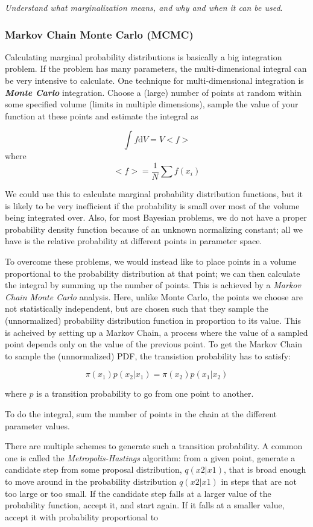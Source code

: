 \documentclass[12pt]{article}
\begin{document}
\emph{Understand what marginalization means, and why and when it can
be used}.


\subsubsection{Markov Chain Monte Carlo (MCMC)}
Calculating marginal probability distributions is basically a big
integration problem. If the problem has many parameters, the
multi-dimensional integral can be very intensive to calculate.
One technique for multi-dimensional integration is
\textbf{\emph{Monte Carlo}} integration. Choose a (large) number of points
at random within some specified volume (limits in multiple
dimensions), sample the value of your function at these points
and estimate the integral as

$$ \int \! f\mathrm{d}V = V<f> $$
where
$$ <f> = \frac{1}{N}\sum f(x_i) $$

We could use this to calculate marginal probability distribution
functions, but it is likely to be very inefficient if the probability
is small over most of the volume being integrated over. Also, for
most Bayesian problems, we do not have a proper probability density
function because of an unknown normalizing constant; all we have is
the relative probability at different points in parameter space.

To overcome these problems, we would instead like to place points
in a volume proportional to the probability distribution at that
point; we can then calculate the integral by summing up the number
of points. This is achieved by a \emph{Markov Chain Monte Carlo}
analysis. Here, unlike Monte Carlo, the points we choose are not
statistically independent, but are chosen such that they sample
the (unnormalized) probability distribution function in proportion
to its value. This is acheived by setting up a Markov Chain,
a process where the value of a sampled point depends only on
the value of the previous point. To get the Markov Chain to sample
the (unnormalized) PDF, the transistion probability has to satisfy:

$$ \pi(x_1)p(x_2|x_1) = \pi(x_2)p(x_1|x_2)  $$

where $p$ is a transition probability to go from one point to another.

To do the integral, sum the number of points in the chain at the
different parameter values.

There are multiple schemes to generate such a transition probability.
A common one is called the \emph{Metropolis-Hastings} algorithm:
from a given point, generate a candidate step from some proposal
distribution, $q(x2|x1)$, that is broad enough to move around in the
probability distribution $q(x2|x1)$ in steps that are not too large
or too small. If the candidate step falls at a larger value of the
probability function, accept it, and start again. If it falls at a
smaller value, accept it with probability proportional to
\end{document}
